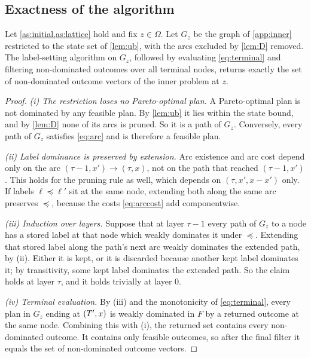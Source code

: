 \subsection{Exactness of the algorithm}\label{app:exact}

\begin{theorem}\label{thm:exact}
  Let \cref{as:initial,as:lattice} hold and fix $z\in\Omega$. Let $G_z$ be the graph of
  \cref{app:inner} restricted to the state set of \cref{lem:ub}, with the arcs excluded by
  \cref{lem:D} removed. The label-setting algorithm on $G_z$, followed by evaluating
  \eqref{eq:terminal} and filtering non-dominated outcomes over all terminal nodes,
  returns exactly the set of non-dominated outcome vectors of the inner problem at $z$.
\end{theorem}

\begin{proof}
  \emph{(i) The restriction loses no Pareto-optimal plan.} A Pareto-optimal plan is not
  dominated by any feasible plan. By \cref{lem:ub} it lies within the state bound, and by
  \cref{lem:D} none of its arcs is pruned. So it is a path of $G_z$. Conversely, every
  path of $G_z$ satisfies \eqref{eq:arc} and is therefore a feasible plan.

  \emph{(ii) Label dominance is preserved by extension.} Arc existence and arc cost
  depend only on the arc $(\tau-1,x')\to(\tau,x)$, not on the path that reached
  $(\tau-1,x')$. This holds for the pruning rule as well, which depends on
  $(\tau,x',x-x')$ only. If labels $\ell\preceq\ell'$ sit at the same node, extending both
  along the same arc preserves $\preceq$, because the costs \eqref{eq:arccost} add
  componentwise.

  \emph{(iii) Induction over layers.} Suppose that at layer $\tau-1$ every path of $G_z$
  to a node has a stored label at that node which weakly dominates it under $\preceq$.
  Extending that stored label along the path's next arc weakly dominates the extended
  path, by (ii). Either it is kept, or it is discarded because another kept label
  dominates it; by transitivity, some kept label dominates the extended path. So the claim
  holds at layer $\tau$, and it holds trivially at layer $0$.

  \emph{(iv) Terminal evaluation.} By (iii) and the monotonicity of \eqref{eq:terminal},
  every plan in $G_z$ ending at $(T',x)$ is weakly dominated in $F$ by a returned outcome
  at the same node. Combining this with (i), the returned set contains every
  non-dominated outcome. It contains only feasible outcomes, so after the final filter it
  equals the set of non-dominated outcome vectors.
\end{proof}

